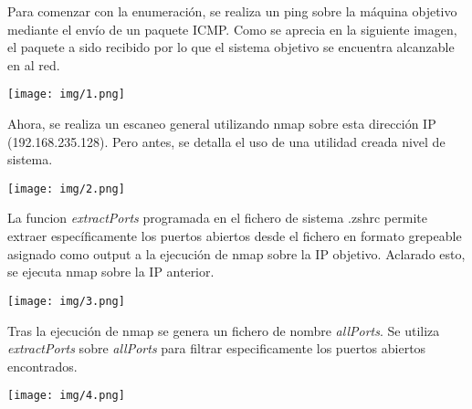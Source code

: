 \documentclass[12pt,oneside,a4paper]{book}
\begin{document}
\hspace{20pt}
Para comenzar con la enumeración, se realiza un ping sobre la máquina objetivo mediante el envío de un paquete ICMP. Como se aprecia en la siguiente imagen, el paquete a sido recibido por lo que el sistema objetivo se encuentra alcanzable en al red.

\vspace{1em}

\begin{center}
    \texttt{[image: img/1.png]}
\end{center}

\vspace{1em}

\hspace{20pt}
Ahora, se realiza un escaneo general utilizando nmap sobre esta dirección IP (192.168.235.128). Pero antes, se detalla el uso de una utilidad creada nivel de sistema. 

\vspace{1em}

\begin{center}
    \texttt{[image: img/2.png]}
\end{center}

\vspace{1em}

\hspace{20pt}
La funcion \textit{extractPorts} programada en el fichero de sistema .zshrc permite extraer específicamente los puertos abiertos desde el fichero en formato grepeable asignado como output a la ejecución de nmap sobre la IP objetivo. Aclarado esto, se ejecuta nmap sobre la IP anterior.

\vspace{1em}

\begin{center}
    \texttt{[image: img/3.png]}
\end{center}

\vspace{1em}

\hspace{20pt}
Tras la ejecución de nmap se genera un fichero de nombre \textit{allPorts}. Se utiliza \textit{extractPorts} sobre \textit{allPorts} para filtrar especificamente los puertos abiertos encontrados.

\vspace{1em}

\begin{center}
    \texttt{[image: img/4.png]}
\end{center}
\end{document}
